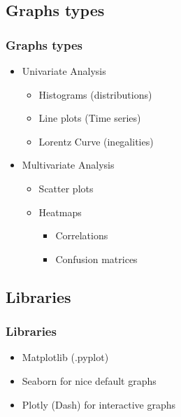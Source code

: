 \subsection{Graphs types}

\begin{frame}\frametitle{Graphs types}
   \begin{itemize}
      \item Univariate Analysis
      \begin{itemize}
         \item Histograms (distributions)
         \item Line plots (Time series)
         \item Lorentz Curve (inegalities)
      \end{itemize}
      \item Multivariate Analysis
      \begin{itemize}
         \item Scatter plots
         \item Heatmaps
         \begin{itemize}
            \item Correlations
            \item Confusion matrices
         \end{itemize}
      \end{itemize}
   \end{itemize}
\end{frame}

\subsection{Libraries}

\begin{frame}\frametitle{Libraries}
   \begin{itemize}
      \item Matplotlib (.pyplot)
      \item Seaborn for nice default graphs
      \item Plotly (Dash) for interactive graphs
   \end{itemize}
\end{frame}



